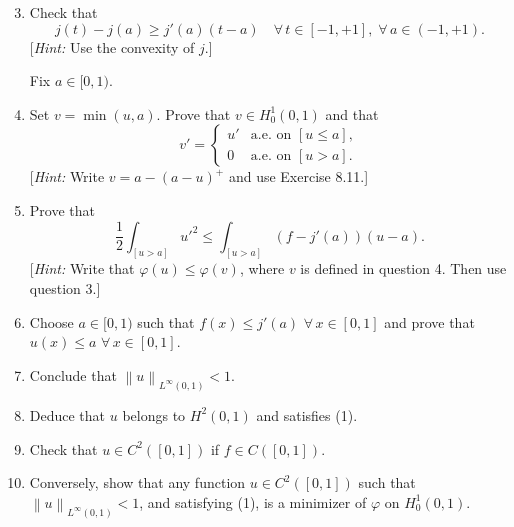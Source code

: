 \documentclass[12pt]{article}
\newcommand{\norm}[1]{\left\|#1\right\|}
\begin{document}
\begin{enumerate}
\setcounter{enumi}{2}
\item Check that
\[
j(t) - j(a) \ge j'(a)(t-a) \quad \forall\, t \in [-1,+1],\; \forall\, a \in (-1,+1).
\]
[\textit{Hint:} Use the convexity of $j$.]
 
Fix $a \in [0,1)$.
 
\item Set $v = \min(u, a)$. Prove that $v \in H^1_0(0,1)$ and that
\[
v' =
\begin{cases}
u' & \text{a.e. on } [u \le a],\\
0 & \text{a.e. on } [u > a].
\end{cases}
\]
[\textit{Hint:} Write $v = a - (a-u)^+$ and use Exercise 8.11.]
 
\item Prove that
\[
\frac{1}{2}\int_{[u>a]} u'^2 \le \int_{[u>a]} (f - j'(a))(u-a).
\]
[\textit{Hint:} Write that $\varphi(u) \le \varphi(v)$, where $v$ is defined in question 4. Then
use question 3.]
 
\item Choose $a \in [0,1)$ such that $f(x) \le j'(a)$ $\forall\, x \in [0,1]$ and prove that
$u(x) \le a$ $\forall\, x \in [0,1]$.
 
\noindent[\textit{Hint:} Show that $\int_0^1 w'^2 = 0$, where $w = (u-a)^+$ belongs to $H^1_0(0,1)$; why?]
 
\item Conclude that $\norm{u}_{L^\infty(0,1)} < 1$.
 
 
\item Deduce that $u$ belongs to $H^2(0,1)$ and satisfies (1).
 
 
\item Check that $u \in C^2([0,1])$ if $f \in C([0,1])$.
 
\item Conversely, show that any function $u \in C^2([0,1])$ such that $\norm{u}_{L^\infty(0,1)} < 1$,
and satisfying (1), is a minimizer of $\varphi$ on $H^1_0(0,1)$.
 
\noindent[\textit{Hint:} Use question 3 with $t = v(x)$ and $a = u(x)$.]
\end{enumerate}
 
\end{document}
